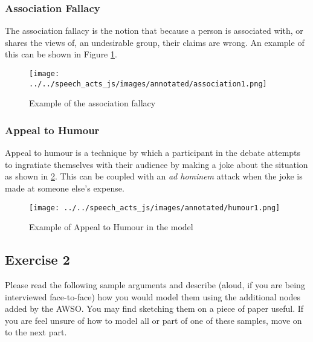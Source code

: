 \subsubsection{Association Fallacy}
The association fallacy is the notion that because a person is associated with, or shares the views of, an undesirable group, their claims are wrong. An example of this can be shown in Figure \ref{figure:association1}.

\begin{figure}[H]
\centering
\texttt{[image: ../../speech\_acts\_js/images/annotated/association1.png]}
\caption{Example of the association fallacy}
\label{figure:association1}
\end{figure}

\subsubsection{Appeal to Humour}
Appeal to humour is a technique by which a participant in the debate attempts to ingratiate themselves with their audience by making a joke about the situation as shown in \ref{figure:humour1}. This can be coupled with an \textit{ad hominem} attack when the joke is made at someone else's expense.%
\begin{figure}[H]
\centering
\texttt{[image: ../../speech\_acts\_js/images/annotated/humour1.png]}
\caption{Example of Appeal to Humour in the model}
\label{figure:humour1}
\end{figure}

\subsection{Exercise 2}
Please read the following sample arguments and describe (aloud, if you are being interviewed face-to-face) how you would model them using the additional nodes added by the AWSO. You may find sketching them on a piece of paper useful. If you are feel unsure of how to model all or part of one of these samples, move on to the next part.


